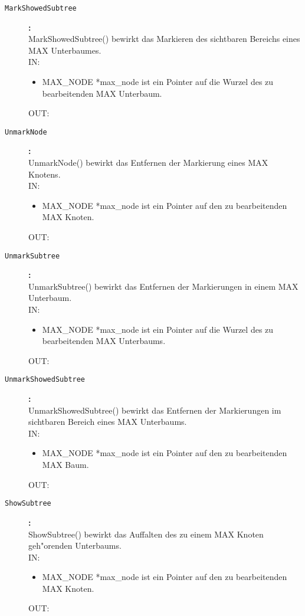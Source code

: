 \begin{description}
\item[\tt MarkShowedSubtree]{\bf :\\}
MarkShowedSubtree() bewirkt das Markieren des sichtbaren Bereichs eines MAX Unterbaumes. \\
IN:
\begin{itemize}
   \item MAX\_NODE *max\_node ist ein Pointer auf die Wurzel des zu bearbeitenden MAX Unterbaum.
\end{itemize}
OUT:

\item[\tt UnmarkNode]{\bf :\\}
UnmarkNode() bewirkt das Entfernen der Markierung eines MAX Knotens. \\
IN:
\begin{itemize}
   \item MAX\_NODE *max\_node ist ein Pointer auf den zu bearbeitenden MAX Knoten.
\end{itemize}
OUT:

\item[\tt UnmarkSubtree]{\bf :\\}
UnmarkSubtree() bewirkt das Entfernen der Markierungen in einem MAX Unterbaum. \\
IN:
\begin{itemize}
   \item MAX\_NODE *max\_node ist ein Pointer auf die Wurzel des zu bearbeitenden MAX Unterbaums.
\end{itemize}
OUT:

\item[\tt UnmarkShowedSubtree]{\bf :\\}
UnmarkShowedSubtree() bewirkt das Entfernen der Markierungen im sichtbaren Bereich eines MAX Unterbaums. \\
IN:
\begin{itemize}
   \item MAX\_NODE *max\_node ist ein Pointer auf den zu bearbeitenden MAX Baum.
\end{itemize}
OUT:

\item[\tt ShowSubtree]{\bf :\\}
ShowSubtree() bewirkt das Auffalten des zu einem MAX Knoten geh"orenden Unterbaums. \\
IN:
\begin{itemize}
   \item MAX\_NODE *max\_node ist ein Pointer auf den zu bearbeitenden MAX Knoten.
\end{itemize}
OUT:


\end{description}
